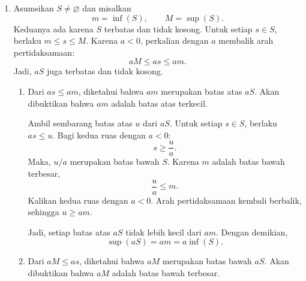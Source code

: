 \documentclass[11pt,a4paper]{article}
\begin{document}
\begin{enumerate}[itemsep=12pt,parsep=5pt]
\begin{enumerate}
          \item Karena $b\ne0$, terdapat invers perkalian $b^{-1}$.
                Berdasarkan definisi pembagian,
                \[
                  \frac{a}{b}=ab^{-1},\qquad
                  \frac{-a}{b}=(-a)b^{-1}.
                \]
                Sifat distributif memberikan
                \begin{align*}
                  \frac{a}{b}+\frac{-a}{b} =ab^{-1}+(-a)b^{-1} =(a+(-a))b^{-1}   =0\cdot b^{-1}   =0.
                \end{align*}
                Jadi, $\dfrac{-a}{b}$ merupakan invers aditif dari $\dfrac{a}{b}$.
                Karena invers aditif tunggal,
                \[
                  -\left(\frac{a}{b}\right)=\frac{-a}{b}.
                \]
        \end{enumerate}

  \item Asumsikan $S\ne \varnothing$ dan misalkan
        \[
          m=\inf(S),\qquad M=\sup(S).
        \]
        Keduanya ada karena $S$ terbatas dan tidak kosong.
        Untuk setiap $s\in S$, berlaku $m\le s\le M$.
        Karena $a<0$, perkalian dengan $a$ membalik arah pertidaksamaan:
        \[
          aM\le as\le am.
        \]
        Jadi, $aS$ juga terbatas dan tidak kosong.

        \begin{enumerate}
          \item Dari $as\le am$, diketahui bahwa $am$ merupakan batas atas $aS$.
                Akan dibuktikan bahwa $am$ adalah batas atas terkecil.

                Ambil sembarang batas atas $u$ dari $aS$.
                Untuk setiap $s\in S$, berlaku $as\le u$.
                Bagi kedua ruas dengan $a<0$:
                \[
                  s\ge\frac{u}{a}.
                \]
                Maka, $u/a$ merupakan batas bawah $S$.
                Karena $m$ adalah batas bawah terbesar,
                \[
                  \frac{u}{a}\le m.
                \]
                Kalikan kedua ruas dengan $a<0$.
                Arah pertidaksamaan kembali berbalik, sehingga $u\ge am$.

                Jadi, setiap batas atas $aS$ tidak lebih kecil dari $am$.
                Dengan demikian,
                \[
                  \sup(aS)=am=a\inf(S).
                \]

          \item Dari $aM\le as$, diketahui bahwa $aM$ merupakan batas bawah $aS$.
                Akan dibuktikan bahwa $aM$ adalah batas bawah terbesar.


\end{enumerate}
\end{enumerate}
\end{document}
